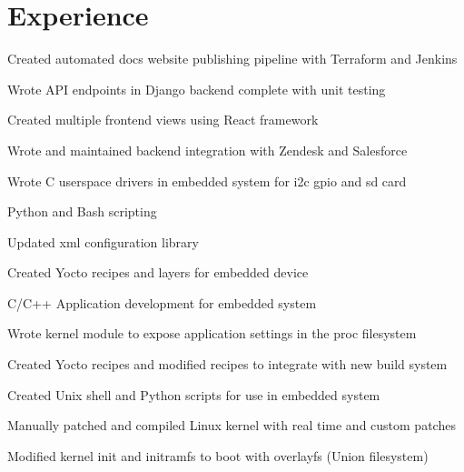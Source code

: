 \documentclass[]{deedy-resume-openfont}
\begin{document}
\begin{minipage}[t]{0.66\textwidth} 


\section{Experience}

\begin{tightemize}
\bigskip
\item Created automated docs website publishing pipeline with Terraform and Jenkins
\item Wrote API endpoints in Django backend complete with unit testing
\item Created multiple frontend views using React framework
\item Wrote and maintained backend integration with Zendesk and Salesforce
\end{tightemize}
\sectionsep

\begin{tightemize}
\item Wrote C userspace drivers in embedded system for i2c gpio and sd card
\item Python and Bash scripting
\item Updated xml configuration library
\item Created Yocto recipes and layers for embedded device
\end{tightemize}
\sectionsep

\begin{tightemize}
\item C/C++ Application development for embedded system
\item Wrote kernel module to expose application settings in the proc filesystem
\item Created Yocto recipes and modified recipes to integrate with new build system
\end{tightemize}
\sectionsep

\begin{tightemize}
\item Created Unix shell and Python scripts for use in embedded system
\item Manually patched and compiled Linux kernel with real time and custom patches
\item Modified kernel init and initramfs to boot with overlayfs (Union filesystem)
\end{tightemize}
\sectionsep


\end{minipage}
\end{document}

